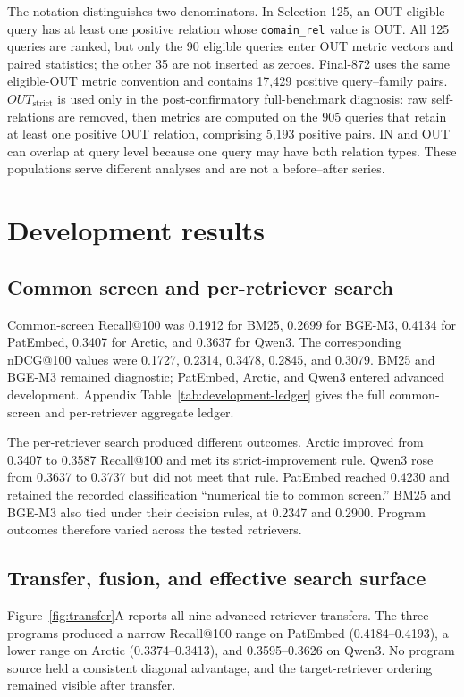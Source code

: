 \documentclass[final,5p,times,twocolumn]{elsarticle}
\begin{document}
The notation distinguishes two denominators. In Selection-125, an OUT-eligible
query has at least one positive relation whose \texttt{domain\_rel} value is
OUT. All 125 queries are ranked, but only the 90 eligible queries enter OUT
metric vectors and paired statistics; the other 35 are not inserted as zeroes.
Final-872 uses the same eligible-OUT metric convention and contains 17,429
positive query--family pairs. \(OUT_{\mathrm{strict}}\) is used only in the
post-confirmatory full-benchmark diagnosis: raw self-relations are removed,
then metrics are computed on the 905 queries that retain at least one positive
OUT relation, comprising 5,193 positive pairs. IN and OUT can overlap at query
level because one query may have both relation types. These populations serve
different analyses and are not a before--after series.

\section{Development results}\label{sec:development}

\subsection{Common screen and per-retriever search}

Common-screen Recall@100 was 0.1912 for BM25, 0.2699 for BGE-M3, 0.4134 for
PatEmbed, 0.3407 for Arctic, and 0.3637 for Qwen3. The corresponding nDCG@100
values were 0.1727, 0.2314, 0.3478, 0.2845, and 0.3079. BM25 and BGE-M3
remained diagnostic; PatEmbed, Arctic, and Qwen3 entered advanced development.
Appendix Table~\ref{tab:development-ledger} gives the full common-screen and
per-retriever aggregate ledger.

The per-retriever search produced different outcomes. Arctic improved from
0.3407 to 0.3587 Recall@100 and met its strict-improvement rule. Qwen3 rose
from 0.3637 to 0.3737 but did not meet that rule. PatEmbed reached 0.4230 and
retained the recorded classification ``numerical tie to common screen.'' BM25
and BGE-M3 also tied under their decision rules, at 0.2347 and 0.2900. Program
outcomes therefore varied across the tested retrievers.

\subsection{Transfer, fusion, and effective search surface}

Figure~\ref{fig:transfer}A reports all nine advanced-retriever transfers. The
three programs produced a narrow Recall@100 range on PatEmbed
(0.4184--0.4193), a lower range on Arctic (0.3374--0.3413), and
0.3595--0.3626 on Qwen3. No
program source held a consistent diagonal advantage, and the target-retriever
ordering remained visible after transfer.
\end{document}
